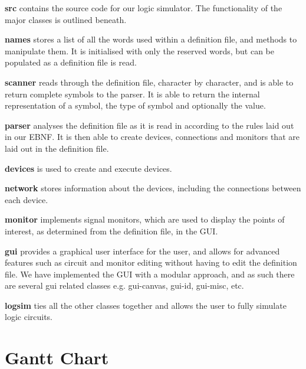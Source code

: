 \documentclass[a4paper,10pt]{article}
\begin{document}
\textbf{src} contains the source code for our logic simulator. The functionality of the major classes is outlined beneath.

\textbf{names} stores a list of all the words used within a definition file, and methods to manipulate them. It is initialised with only the reserved words, but can be populated as a definition file is read.

\textbf{scanner} reads through the definition file, character by character, and is able to return complete symbols to the parser. It is able to return the internal representation of a symbol, the type of symbol and optionally the value.

\textbf{parser} analyses the definition file as it is read in according to the rules laid out in our EBNF. It is then able to create devices, connections and monitors that are laid out in the definition file.

\textbf{devices} is used to create and execute devices. 

\textbf{network} stores information about the devices, including the connections between each device.

\textbf{monitor} implements signal monitors, which are used to display the points of interest, as determined from the definition file, in the GUI.

\textbf{gui} provides a graphical user interface for the user, and allows for advanced features such as circuit and monitor editing without having to edit the definition file. We have implemented the GUI with a modular approach, and as such there are several gui related classes e.g. gui-canvas, gui-id, gui-misc, etc.

\textbf{logsim} ties all the other classes together and allows the user to fully simulate logic circuits.

\pagebreak

\section{Gantt Chart}
\label{sec:gantt}
\end{document}
